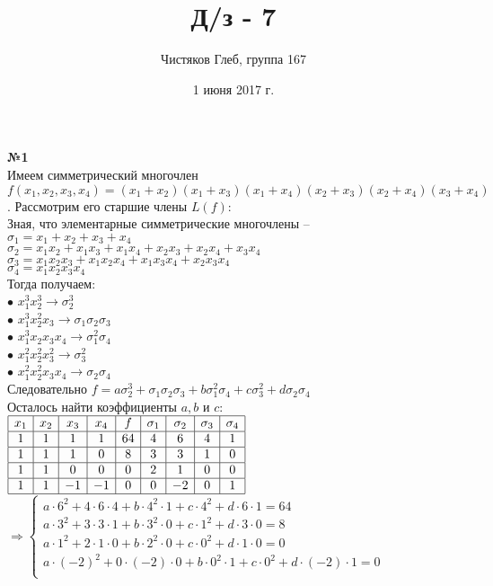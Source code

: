 \documentclass[a4paper, 12pt]{article}
\newcommand\tab[1][1cm]{\hspace*{#1}}
\begin{document}
	\title{Д/з - 7}
	\author{Чистяков Глеб, группа 167}
	\date{1 июня 2017 г.}
	
	\maketitle
	
	\textbf{№1} \\
	
	Имеем симметрический многочлен \\ $f(x_1, x_2, x_3, x_4) = (x_1 + x_2)(x_1 + x_3)(x_1 + x_4)(x_2 + x_3)(x_2 + x_4)(x_3 + x_4)$. Рассмотрим его старшие члены $L(f)$: \\
	\tab Зная, что элементарные симметрические многочлены -- \\
	$\sigma_1 = x_1 + x_2 + x_3 + x_4$ \\
	$\sigma_2 = x_1x_2 + x_1x_3 + x_1x_4 + x_2x_3 + x_2x_4 + x_3x_4$ \\ 
	$\sigma_3 = x_1x_2x_3 + x_1x_2x_4 + x_1x_3x_4 + x_2x_3x_4$ \\
	$\sigma_4 = x_1x_2x_3x_4$ \\
	\tab Тогда получаем: \\
	$\bullet$ $x_1^3x_2^3 \rightarrow \sigma_2^3$ \\
	$\bullet$ $x_1^3x_2^2x_3 \rightarrow \sigma_1\sigma_2\sigma_3$ \\
	$\bullet$ $x_1^3x_2x_3x_4 \rightarrow \sigma_1^2\sigma_4$ \\
	$\bullet$ $x_1^2x_2^2x_3^2 \rightarrow \sigma_3^2$ \\
	$\bullet$ $x_1^2x_2^2x_3x_4\rightarrow \sigma_2\sigma_4$ \\
	Следовательно $f = a\sigma_2^3 + \sigma_1\sigma_2\sigma_3 + b\sigma_1^2\sigma_4 + c\sigma_3^2 + d\sigma_2\sigma_4$ \\
	Осталось найти коэффициенты $a,b$ и $c$: \\
	$\begin{array}{|c|c|c|c|c|c|c|c|c|}
		\hline
		x_1 & x_2 & x_3 & x_4 & f & \sigma_1 & \sigma_2 & \sigma_3 & \sigma_4 \\
		\hline
		1 & 1 & 1 & 1 & 64 & 4 & 6 & 4 & 1 \\
		\hline
		1 & 1 & 1 & 0 & 8 & 3 & 3 & 1 & 0 \\
		\hline
		1 & 1 & 0 & 0 & 0 & 2 & 1 & 0 & 0 \\
		\hline
		1 & 1 & -1 & -1 & 0 & 0 & -2 & 0 & 1 \\
		\hline
	\end{array}$
	$\Rightarrow \begin{cases}
		a\cdot6^2 + 4\cdot6\cdot4 + b\cdot4^2\cdot1 + c\cdot4^2 + d\cdot6\cdot1 = 64 \\
		a\cdot3^2 + 3\cdot3\cdot1 + b\cdot3^2\cdot0 + c\cdot1^2 + d\cdot3\cdot0 = 8 \\
		a\cdot1^2 + 2\cdot1\cdot0 + b\cdot2^2\cdot0 + c\cdot0^2 + d\cdot1\cdot0 = 0 \\
		a\cdot(-2)^2 + 0\cdot(-2)\cdot0 + b\cdot0^2\cdot1 + c\cdot0^2 + d\cdot(-2)\cdot1 = 0 \\
	\end{cases}$
\end{document}

